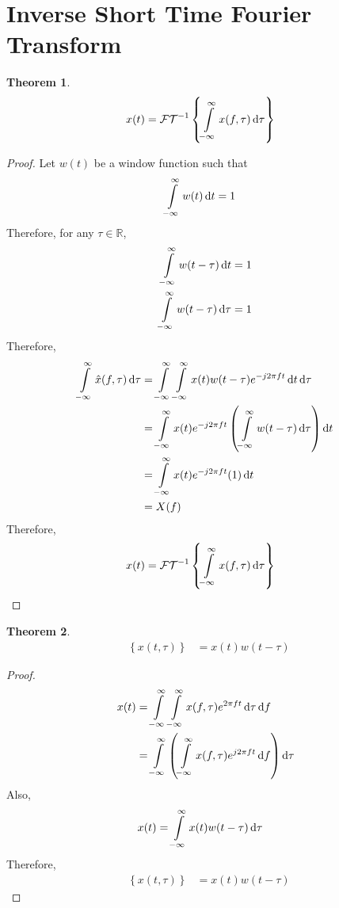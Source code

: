 \documentclass[titlepage, fleqn, a4paper, 12pt, twoside]{article}
\theoremstyle{definition}
\theoremstyle{theorem}
\newtheorem{theorem}{Theorem}
\DeclareMathOperator{\IFT}{\mathcal{FT}^{-1}}
\begin{document}
\section{Inverse Short Time Fourier Transform}

\begin{theorem}
	\begin{align*}
		x(t) &= \IFT\left\{ \int\limits_{-\infty}^{\infty} x(f,\tau) \dif \tau \right\}
	\end{align*}
\end{theorem}

\begin{proof}
	Let $w(t)$ be a window function such that
	\begin{align*}
		\int\limits_{-\infty}^{\infty} w(t) \dif t &= 1
	\end{align*}
	Therefore, for any $\tau \in \mathbb{R}$,
	\begin{align*}
		\int\limits_{-\infty}^{\infty} w(t - \tau) \dif t &= 1\\
		\int\limits_{-\infty}^{\infty} w(t - \tau) \dif \tau &= 1
	\end{align*}
	Therefore,
	\begin{align*}
		\int\limits_{-\infty}^{\infty} \hat{x}(f,\tau) \dif \tau &= \int\limits_{-\infty}^{\infty} \int\limits_{-\infty}^{\infty} x(t) w(t - \tau) e^{-j 2 \pi f t} \dif t \dif \tau\\
		&= \int\limits_{-\infty}^{\infty} x(t) e^{-j 2 \pi f t} \left( \int\limits_{-\infty}^{\infty} w(t - \tau) \dif \tau \right) \dif t\\
		&= \int\limits_{-\infty}^{\infty} x(t) e^{-j 2 \pi f t} (1) \dif t\\
		&= X(f)
	\end{align*}
	Therefore,
	\begin{align*}
		x(t) &= \IFT\left\{ \int\limits_{-\infty}^{\infty} x(f,\tau) \dif \tau \right\}
	\end{align*}
\end{proof}

\begin{theorem}
	\begin{align*}
		\IFT\left\{ x(t,\tau) \right\} &= x(t) w(t - \tau)
	\end{align*}
\end{theorem}

\begin{proof}
	\begin{align*}
		x(t) &= \int\limits_{-\infty}^{\infty} \int\limits_{-\infty}^{\infty} x(f,\tau) e^{2 \pi f t} \dif \tau \dif f\\
		&= \int\limits_{-\infty}^{\infty} \left( \int\limits_{-\infty}^{\infty} x(f,\tau) e^{j 2 \pi f t} \dif f \right) \dif \tau
	\end{align*}
	Also,
	\begin{align*}
		x(t) &= \int\limits_{-\infty}^{\infty} x(t) w(t - \tau) \dif \tau
	\end{align*}
	Therefore,
	\begin{align*}
		\IFT\left\{ x(t,\tau) \right\} &= x(t) w(t - \tau)
	\end{align*}
\end{proof}
\end{document}
